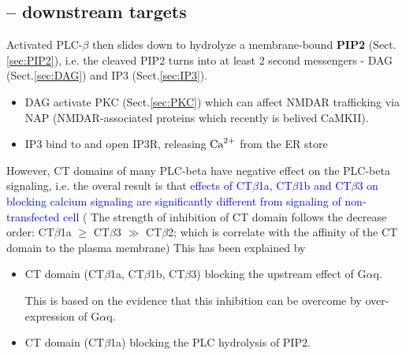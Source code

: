 \subsection{-- downstream targets}

Activated PLC-$\beta$ then slides down to hydrolyze a membrane-bound {\bf PIP2}
(Sect.\ref{sec:PIP2}), i.e.  the cleaved PIP2 turns into at least
2 second messengers - DAG (Sect.\ref{sec:DAG}) and IP3 (Sect.\ref{sec:IP3}).
\begin{itemize}
  \item DAG activate PKC (Sect.\ref{sec:PKC}) which can affect NMDAR trafficking
  via NAP (NMDAR-associated proteins which recently is belived CaMKII).
  
  \item IP3 bind to and open IP3R, releasing ${\text{Ca}^{2+}}$ from the ER store
\end{itemize}
However, CT domains of many PLC-beta have negative effect on the PLC-beta
signaling, i.e. the overal result is that \textcolor{blue}{effects of
CT$\beta$1a, CT$\beta$1b and CT$\beta$3 on blocking calcium signaling are
significantly different from signaling of non-transfected cell} (
The strength of inhibition of CT domain follows the decrease order: 
CT$\beta$1a  $\geq$ CT$\beta$3 $\gg$ CT$\beta$2; which is correlate with the
affinity of the CT domain to the plasma membrane) This has been explained by
 
\begin{itemize}
  
  \item  CT domain (CT$\beta$1a, CT$\beta$1b, CT$\beta$3) blocking the upstream
  effect of G$\alpha$q.

This is based on the evidence that this inhibition
can be overcome by over-expression of G$\alpha$q. 
  
  \item CT domain (CT$\beta$1a) blocking the PLC hydrolysis of PIP2.
\end{itemize}


